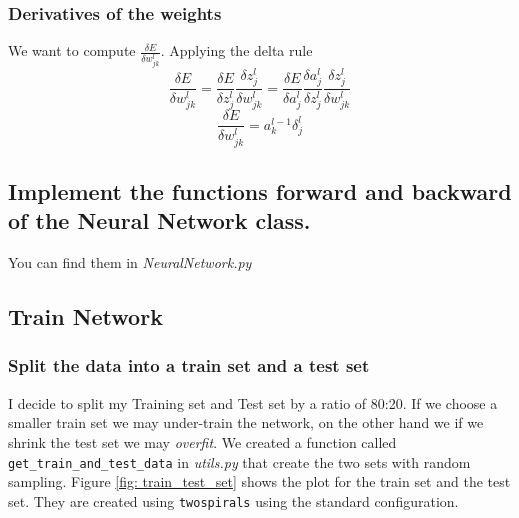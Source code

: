 \documentclass[11pt]{article}
\begin{document}
\subsubsection{Derivatives of the weights}
We want to compute $\frac{\delta E}{\delta w^l_{jk}}$. Applying the delta rule
\begin{equation}
\frac{\delta E}{\delta w^l_{jk}} = \frac{\delta E}{\delta z^l_j}\frac{\delta z^l_j}{\delta w^l_{jk}} =	
\frac{\delta E}{\delta a^l_j}\frac{\delta a^l_j}{\delta z^l_{j}}
\frac{\delta z^l_j}{\delta w^l_{jk}}
\end{equation}
\begin{equation}
\label{eq:derivativesWeigthDeltas}	
\frac{\delta E}{\delta w^l_{jk}} = a^{l-1}_k \delta^l_j
\end{equation}
\subsection{Implement the functions forward and backward of the Neural Network class.}
You can find them in \emph{NeuralNetwork.py}
\subsection{Train Network}
\subsubsection{ Split the data into a train set and a test set}
I decide to split my Training set and Test set by a ratio of 80:20. If we choose a smaller train set we may under-train the network, on the other hand we if we shrink the test set we may \emph{overfit}. We created a function called \texttt{get\_train\_and\_test\_data} in \emph{utils.py} that create the two sets with random sampling.
Figure \ref{fig: train_test_set} shows the plot for the train set and the test set. They are created using \texttt{twospirals} using the standard configuration.
\end{document}
